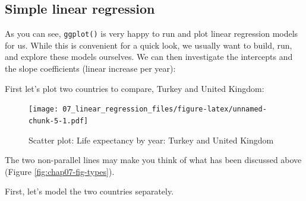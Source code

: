 \documentclass[
  12pt,
  krantz2]{krantz}
\makeatletter
\newenvironment{Shaded}{\begin{snugshade}}{\end{snugshade}}
\newcommand{\CommentTok}[1]{\textcolor[rgb]{0.56,0.35,0.01}{\textit{#1}}}
\newcommand{\DataTypeTok}[1]{\textcolor[rgb]{0.13,0.29,0.53}{#1}}
\newcommand{\KeywordTok}[1]{\textcolor[rgb]{0.13,0.29,0.53}{\textbf{#1}}}
\newcommand{\NormalTok}[1]{#1}
\newcommand{\OperatorTok}[1]{\textcolor[rgb]{0.81,0.36,0.00}{\textbf{#1}}}
\newcommand{\StringTok}[1]{\textcolor[rgb]{0.31,0.60,0.02}{#1}}
\newenvironment{kframe}{%
\medskip{}
\setlength{\fboxsep}{.8em}
 \def\at@end@of@kframe{}%
 \ifinner\ifhmode%
  \def\at@end@of@kframe{\end{minipage}}%
  \begin{minipage}{\columnwidth}%
 \fi\fi%
 \def\FrameCommand##1{\hskip\@totalleftmargin \hskip-\fboxsep
 \colorbox{shadecolor}{##1}\hskip-\fboxsep
     \hskip-\linewidth \hskip-\@totalleftmargin \hskip\columnwidth}%
 \MakeFramed {\advance\hsize-\width
   \@totalleftmargin\z@ \linewidth\hsize
   \@setminipage}}%
 {\par\unskip\endMakeFramed%
 \at@end@of@kframe}
\renewenvironment{Shaded}{\begin{kframe}}{\end{kframe}}
\makeatother
\begin{document}
\hypertarget{simple-linear-regression}{%
\subsection{Simple linear regression}\label{simple-linear-regression}}


As you can see, \texttt{ggplot()} is very happy to run and plot linear regression models for us.
While this is convenient for a quick look, we usually want to build, run, and explore these models ourselves.
We can then investigate the intercepts and the slope coefficients (linear increase per year):

First let's plot two countries to compare, Turkey and United Kingdom:

\begin{Shaded}
\end{Shaded}

\begin{figure}
\centering
\texttt{[image: 07\_linear\_regression\_files/figure-latex/unnamed-chunk-5-1.pdf]}
\caption{\label{fig:unnamed-chunk-5}Scatter plot: Life expectancy by year: Turkey and United Kingdom}
\end{figure}

The two non-parallel lines may make you think of what has been discussed above (Figure \ref{fig:chap07-fig-types}).

First, let's model the two countries separately.

\begin{Shaded}
\end{Shaded}
\end{document}
